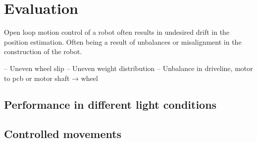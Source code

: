 \chapter{Evaluation} 

Open loop motion control of a robot often results in undesired drift in the position estimation.
Often being a result of unbalances or misalignment in the construction of the robot.

– Uneven wheel slip
– Uneven weight distribution
– Unbalance in driveline, motor to pcb or motor shaft → wheel


\section{Performance in different light conditions}



\section{Controlled movements}





